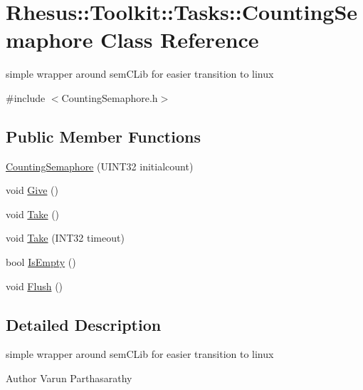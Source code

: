 \hypertarget{class_rhesus_1_1_toolkit_1_1_tasks_1_1_counting_semaphore}{\section{Rhesus\-:\-:Toolkit\-:\-:Tasks\-:\-:Counting\-Semaphore Class Reference}
\label{class_rhesus_1_1_toolkit_1_1_tasks_1_1_counting_semaphore}
}


simple wrapper around sem\-C\-Lib for easier transition to linux  




{\ttfamily \#include $<$Counting\-Semaphore.\-h$>$}

\subsection*{Public Member Functions}
\begin{DoxyCompactItemize}
\item 
\hyperlink{class_rhesus_1_1_toolkit_1_1_tasks_1_1_counting_semaphore_ae249f411092cd86136d4dc5192a3f67f}{Counting\-Semaphore} (U\-I\-N\-T32 initialcount)
\item 
void \hyperlink{class_rhesus_1_1_toolkit_1_1_tasks_1_1_counting_semaphore_a973554dba33222f0ff7f287928191267}{Give} ()
\item 
void \hyperlink{class_rhesus_1_1_toolkit_1_1_tasks_1_1_counting_semaphore_a2bc3fe4d8153cd979558ee09b66ca73e}{Take} ()
\item 
void \hyperlink{class_rhesus_1_1_toolkit_1_1_tasks_1_1_counting_semaphore_a9b54bea70b5decdcf7131375906f0a25}{Take} (I\-N\-T32 timeout)
\item 
bool \hyperlink{class_rhesus_1_1_toolkit_1_1_tasks_1_1_counting_semaphore_a2b06dbf1a451073c12c94e38f5f510dd}{Is\-Empty} ()
\item 
void \hyperlink{class_rhesus_1_1_toolkit_1_1_tasks_1_1_counting_semaphore_a3b2d7faf8d16e75dfd343ec682de03b4}{Flush} ()
\end{DoxyCompactItemize}


\subsection{Detailed Description}
simple wrapper around sem\-C\-Lib for easier transition to linux 

\begin{DoxyAuthor}{Author}
Varun Parthasarathy 
\end{DoxyAuthor}



